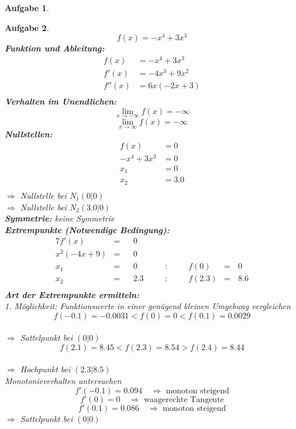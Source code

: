 \documentclass[12pt]{article}
\theoremstyle{note}
\newtheorem{aufgabe}{Aufgabe}
\begin{document}
\begin{flushleft}
\begin{aufgabe}
\end{aufgabe}\clearpage\begin{aufgabe} ~  
$$f(x)=- x^{4} + 3 x^{3}$$ 
{\bf Funktion und Ableitung:} 
\begin{align*} 
f(x)&=- x^{4} + 3 x^{3}\\ 
f'(x)&=- 4 x^{3} + 9 x^{2}\\ 
f''(x)&=6 x \left(- 2 x + 3\right)\\ 
\end{align*} 
{\bf Verhalten im Unendlichen:} 
\[ \lim_{x\rightarrow -\infty} f(x) =-\infty\]\[ \lim_{x\rightarrow\infty} f(x) =-\infty\]{\bf Nullstellen:} 
\begin{align*} 
f(x)&=0 \\ 
- x^{4} + 3 x^{3}&=0 \\ 
x_1&=0\\ 
x_2&=3.0\\ 
\end{align*} 
$\Rightarrow$ Nullstelle bei $N_1(0|0)$ \\ 
$\Rightarrow$ Nullstelle bei $N_2(3.0|0)$ \\ 
{\bf Symmetrie:} 
keine Symmetrie \\ 
{\bf Extrempunkte (Notwendige Bedingung):} 
\begin{alignat*}{7} 
f'(x)&=& &0& \\ 
x^{2} \left(- 4 x + 9\right)&=& &0& \\ 
x_1&=& &0& \quad &:& \quad &f(0)&=& \,0\\ 
x_2&=& &2.3& \quad &:& \quad &f(2.3)&=& \,8.6\\ 
\end{alignat*} 
{\bf Art der Extrempunkte ermitteln:} \\[1em] 
{\em 1. M\"oglichkeit:} Funktionswerte in einer gen\"ugend kleinen Umgebung vergleichen \\ 
$$f(-0.1)=-0.0031  <  f(0)=0  <   f(0.1)=0.0029$$\\ 
$\Rightarrow$ Sattelpunkt bei $(0|0)$ \\ 
\vspace{1em}$$f(2.1)=8.45  <  f(2.3)=8.54  >  f(2.4)=8.44$$\\ 
$\Rightarrow$ Hochpunkt bei $(2.3|8.5)$ \\ 
\vspace{1em}{\em 2. M\"oglichkeit:} Monotonieverhalten untersuchen \\ 
$$f'(-0.1)=0.094\quad \Rightarrow \text{ monoton steigend} $$$$f'(0)=0 \quad \Rightarrow \text{ waagerechte Tangente} $$$$f'(0.1)=0.086\quad \Rightarrow \text{ monoton steigend} $$$\Rightarrow$ Sattelpunkt bei $(0|0)$ \\ 

\end{aufgabe}
\end{flushleft}
\end{document}
